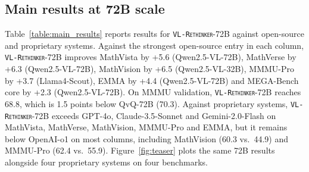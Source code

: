 \documentclass{article}
\newcommand{\model}{\texttt{\textsc{VL-Rethinker}}\xspace}
\begin{document}
\subsection{Main results at 72B scale}

Table~\ref{table:main_results} reports results for \model-72B against open-source and proprietary systems. Against the strongest open-source entry in each column, \model-72B improves MathVista by +5.6 (Qwen2.5-VL-72B), MathVerse by +6.3 (Qwen2.5-VL-72B), MathVision by +6.5 (Qwen2.5-VL-32B), MMMU-Pro by +3.7 (Llama4-Scout), EMMA by +4.4 (Qwen2.5-VL-72B) and MEGA-Bench core by +2.3 (Qwen2.5-VL-72B). On MMMU validation, \model-72B reaches 68.8, which is 1.5 points below QvQ-72B (70.3). Against proprietary systems, \model-72B exceeds GPT-4o, Claude-3.5-Sonnet and Gemini-2.0-Flash on MathVista, MathVerse, MathVision, MMMU-Pro and EMMA, but it remains below OpenAI-o1 on most columns, including MathVision (60.3 vs.\ 44.9) and MMMU-Pro (62.4 vs.\ 55.9). Figure~\ref{fig:teaser} plots the same 72B results alongside four proprietary systems on four benchmarks.
\end{document}
